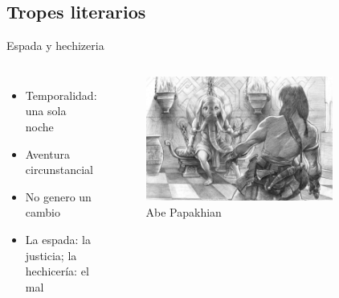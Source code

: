 \subsection{Tropes literarios}
\begin{frame}{Espada y hechizeria}
\begin{columns}
 \begin{itemize}
    \item Temporalidad: una sola noche
    \item Aventura circunstancial
    \item No genero un cambio
    \item La espada: la justicia; la hechicería: el mal
 \end{itemize}
 \begin{figure}[htb]
    \centering
    \includegraphics[width=0.8\textwidth]{img/tributos/elephant07}
    \caption{Abe Papakhian}
 \end{figure}
 \end{columns}
\end{frame}

